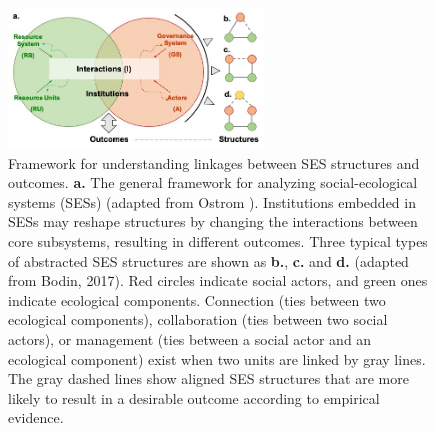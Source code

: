 \documentclass{nsr}
\begin{document}
\begin{figure}
	\centering
	\includegraphics[width=16pc]{../../../figs/diagrams/framework.jpg}
	\caption{
		Framework for understanding linkages between SES structures and outcomes.
		\textbf{a.} The general framework for analyzing social-ecological systems (SESs) (adapted from Ostrom \cite{ostromGeneralFrameworkAnalyzing2009}). Institutions embedded in SESs may reshape structures by changing the interactions between core subsystems, resulting in different outcomes.
        Three typical types of abstracted SES structures are shown as \textbf{b.}, \textbf{c.} and \textbf{d.} (adapted from Bodin, 2017)\cite{bodinCollaborativeenvironmentalgovernance2017}. Red circles indicate social actors, and green ones indicate ecological components. Connection (ties between two ecological components), collaboration (ties between two social actors), or management (ties between a social actor and an ecological component) exist when two units are linked by gray lines. The gray dashed lines show aligned SES structures that are more likely to result in a desirable outcome according to empirical evidence.
	}
    \label{fig:framework}
\end{figure}
\end{document}
